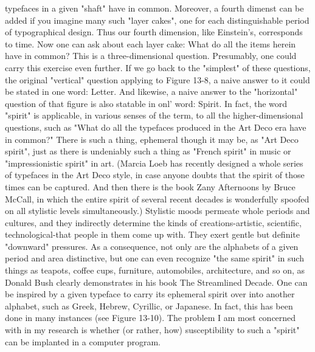 typefaces in a given "shaft" have in common. Moreover, a fourth dimenst can be added if
you imagine many such "layer cakes", one for each distinguishable period of
typographical design. Thus our fourth dimension, like Einstein's, corresponds to time.
Now one can ask about each layer cake: What do all the items herein have in common?
This is a three-dimensional question. Presumably, one could carry this exercise even
further.
         If we go back to the "simplest" of these questions, the original "vertical" question
applying to Figure 13-8, a naive answer to it could be stated in one word: Letter. And
likewise, a naive answer to the "horizontal" question of that figure is also statable in onl'
word: Spirit. In fact, the word "spirit" is applicable, in various senses of the term, to all
the higher-dimensional questions, such as "What do all the typefaces produced in the Art
Deco era have in common?" There is such a thing, ephemeral though it may be, as "Art
Deco spirit", just as there is undeniably such a thing as "French spirit" in music or
"impressionistic spirit" in art. (Marcia Loeb has recently designed a whole series of
typefaces in the Art Deco style, in case anyone doubts that the spirit of those times can be
captured. And then there is the book Zany Afternoons by Bruce McCall, in which the
entire spirit of several recent decades is wonderfully spoofed on all stylistic levels
simultaneously.)
         Stylistic moods permeate whole periods and cultures, and they indirectly
determine the kinds of creations-artistic, scientific, technological-that people in them
come up with. They exert gentle but definite "downward" pressures. As a consequence,
not only are the alphabets of a given period and area distinctive, but one can even
recognize "the same spirit" in such things as teapots, coffee cups, furniture, automobiles,
architecture, and so on, as Donald Bush clearly demonstrates in his book The Streamlined
Decade. One can be inspired by a given typeface to carry its ephemeral spirit over into
another alphabet, such as Greek, Hebrew, Cyrillic, or Japanese. In fact, this has been
done in many instances (see Figure 13-10). The problem I am most concerned with in my
research is whether (or rather, how) susceptibility to such a "spirit" can be implanted in a
computer program.

